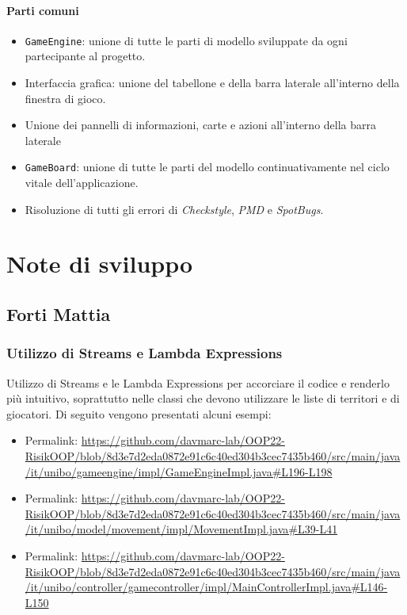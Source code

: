 \documentclass[a4paper,12pt]{report}
\begin{document}
\paragraph{Parti comuni}
%
\begin{itemize}
    \item{\texttt{GameEngine}:} unione di tutte le parti di modello sviluppate da ogni partecipante al progetto.
    \item{Interfaccia grafica:} unione del tabellone e della barra laterale all'interno della finestra di gioco.
    \item Unione dei pannelli di informazioni, carte e azioni all'interno della barra laterale
    \item{\texttt{GameBoard}:} unione di tutte le parti del modello continuativamente nel ciclo vitale dell'applicazione.
    \item Risoluzione di tutti gli errori di \textit{Checkstyle}, \textit{PMD} e \textit{SpotBugs}.
\end{itemize}
%
\section{Note di sviluppo}
%
\subsection*{Forti Mattia}
%
\subsubsection*{Utilizzo di Streams e Lambda Expressions}
%
Utilizzo di Streams e le Lambda Expressions per accorciare il codice e renderlo pi\`u intuitivo, soprattutto nelle classi che devono utilizzare le liste di territori e di giocatori. Di seguito vengono presentati alcuni esempi:
\begin{itemize}
    \item{Permalink:} \url{https://github.com/davmarc-lab/OOP22-RisikOOP/blob/8d3e7d2eda0872e91c6c40ed304b3cec7435b460/src/main/java/it/unibo/gameengine/impl/GameEngineImpl.java#L196-L198}
    \item{Permalink:} \url{https://github.com/davmarc-lab/OOP22-RisikOOP/blob/8d3e7d2eda0872e91c6c40ed304b3cec7435b460/src/main/java/it/unibo/model/movement/impl/MovementImpl.java#L39-L41}
    \item{Permalink:} \url{https://github.com/davmarc-lab/OOP22-RisikOOP/blob/8d3e7d2eda0872e91c6c40ed304b3cec7435b460/src/main/java/it/unibo/controller/gamecontroller/impl/MainControllerImpl.java#L146-L150}
\end{itemize}
%
\end{document}

